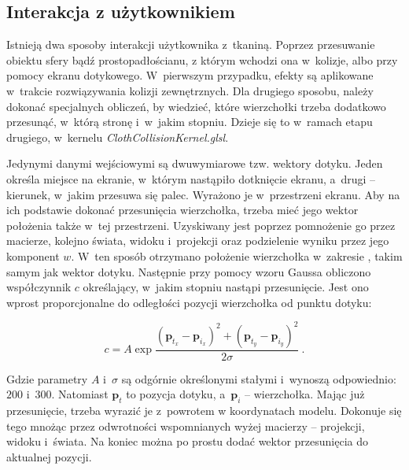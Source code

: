 		\subsection{Interakcja z użytkownikiem}
		\label{t:symulacja:dzialanie:interakcja}
			
		
		Istnieją dwa sposoby interakcji użytkownika z~tkaniną. Poprzez przesuwanie obiektu sfery bądź prostopadłościanu, z którym wchodzi ona w~kolizje, albo przy pomocy ekranu dotykowego. W~pierwszym przypadku, efekty są aplikowane w~trakcie rozwiązywania kolizji zewnętrznych. Dla drugiego sposobu, należy dokonać specjalnych obliczeń, by wiedzieć, które wierzchołki trzeba dodatkowo przesunąć, w~którą stronę i~w~jakim stopniu. Dzieje się to w~ramach etapu drugiego, w~kernelu \emph{ClothCollisionKernel.glsl}.
		
		Jedynymi danymi wejściowymi są dwuwymiarowe tzw. wektory dotyku. Jeden określa miejsce na ekranie, w~którym nastąpiło dotknięcie ekranu, a~drugi -- kierunek, w~jakim przesuwa się palec. Wyrażono je w~przestrzeni ekranu. Aby na ich podstawie dokonać przesunięcia wierzchołka, trzeba mieć jego wektor położenia także w~tej przestrzeni. Uzyskiwany jest poprzez pomnożenie go przez macierze, kolejno świata, widoku i~projekcji oraz podzielenie wyniku przez jego komponent \(w\). W~ten sposób otrzymano położenie wierzchołka w~zakresie \(<-1, 1>\), takim samym jak wektor dotyku. Następnie przy pomocy wzoru Gaussa obliczono współczynnik \(c\) określający, w~jakim stopniu nastąpi przesunięcie. Jest ono wprost proporcjonalne do odległości pozycji wierzchołka od punktu dotyku:
		
		
		\begin{equation}
		c = A\exp{\frac{(\mathbf{p}_{t_{x}} - \mathbf{p}_{i_{x}})^{2} + (\mathbf{p}_{t_{y}} - \mathbf{p}_{i_{y}})^{2}}{2 \sigma}} \ .
		\end{equation} 
		
		Gdzie parametry \( A \) i~\( \sigma \) są odgórnie określonymi stałymi i~wynoszą odpowiednio: \(200\) i~\(300\). Natomiast \( \mathbf{p}_{t} \) to pozycja dotyku, a~\( \mathbf{p}_{i} \)  -- wierzchołka. Mając już przesunięcie, trzeba wyrazić je z~powrotem w koordynatach modelu. Dokonuje się tego mnożąc przez odwrotności wspomnianych wyżej macierzy -- projekcji, widoku i~świata. Na koniec można po prostu dodać wektor przesunięcia do aktualnej pozycji.
		\newline
		
